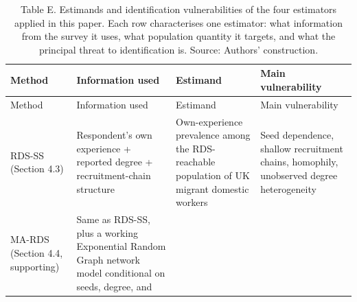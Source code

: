 \documentclass[
  12pt,
  letterpaper,
  DIV=11,
  numbers=noendperiod]{scrartcl}
\begin{document}
\begin{longtable}[]{@{}
  >{\raggedright\arraybackslash}p{}
  >{\raggedright\arraybackslash}p{}
  >{\raggedright\arraybackslash}p{}
  >{\raggedright\arraybackslash}p{}@{}}
\caption{Table E. Estimands and identification vulnerabilities of the
four estimators applied in this paper. Each row characterises one
estimator: what information from the survey it uses, what population
quantity it targets, and what the principal threat to identification is.
Source: Authors' construction.}\label{tbl-estimands}\tabularnewline
\toprule\noalign{}
\begin{minipage}[b]{\linewidth}\raggedright
Method
\end{minipage} & \begin{minipage}[b]{\linewidth}\raggedright
Information used
\end{minipage} & \begin{minipage}[b]{\linewidth}\raggedright
Estimand
\end{minipage} & \begin{minipage}[b]{\linewidth}\raggedright
Main vulnerability
\end{minipage} \\
\midrule\noalign{}
\endfirsthead
\toprule\noalign{}
\begin{minipage}[b]{\linewidth}\raggedright
Method
\end{minipage} & \begin{minipage}[b]{\linewidth}\raggedright
Information used
\end{minipage} & \begin{minipage}[b]{\linewidth}\raggedright
Estimand
\end{minipage} & \begin{minipage}[b]{\linewidth}\raggedright
Main vulnerability
\end{minipage} \\
\midrule\noalign{}
\endhead
\bottomrule\noalign{}
\endlastfoot
RDS-SS (Section 4.3) & Respondent's own experience + reported degree +
recruitment-chain structure & Own-experience prevalence among the
RDS-reachable population of UK migrant domestic workers & Seed
dependence, shallow recruitment chains, homophily, unobserved degree
heterogeneity \\
MA-RDS (Section 4.4, supporting) & Same as RDS-SS, plus a working
Exponential Random Graph network model conditional on seeds, degree, and

\end{longtable}
\end{document}
